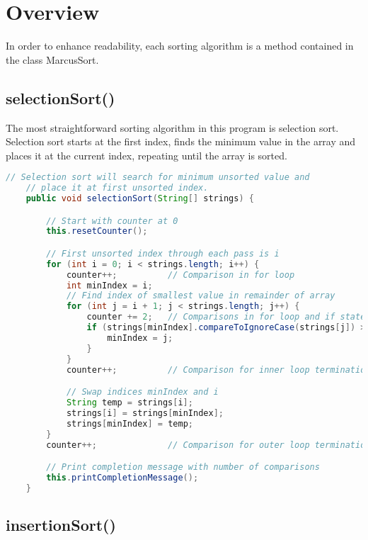 \documentclass[letterpaper, 10pt]{article}
\begin{document}
\section{Overview}

\hspace{1.0em}In order to enhance readability, each sorting algorithm is a method contained in the class MarcusSort.

\subsection{selectionSort()}

\hspace{1.0em}The most straightforward sorting algorithm in this program is selection sort. Selection sort starts at the first index, finds the minimum value in the array and places it at the current index, repeating until the array is sorted.

\begin{lstlisting}[language=Java, firstnumber=16]
    // Selection sort will search for minimum unsorted value and
    // place it at first unsorted index.
    public void selectionSort(String[] strings) {

        // Start with counter at 0
        this.resetCounter();

        // First unsorted index through each pass is i
        for (int i = 0; i < strings.length; i++) {
            counter++;          // Comparison in for loop
            int minIndex = i;
            // Find index of smallest value in remainder of array
            for (int j = i + 1; j < strings.length; j++) {
                counter += 2;   // Comparisons in for loop and if statement
                if (strings[minIndex].compareToIgnoreCase(strings[j]) > 0) {
                    minIndex = j;
                }
            }
            counter++;          // Comparison for inner loop termination

            // Swap indices minIndex and i
            String temp = strings[i];
            strings[i] = strings[minIndex];
            strings[minIndex] = temp;
        }
        counter++;              // Comparison for outer loop termination

        // Print completion message with number of comparisons
        this.printCompletionMessage();
    }
\end{lstlisting}

\subsection{insertionSort()}
\end{document}
